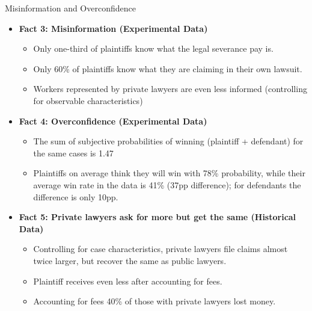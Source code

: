 \documentclass[9pt]{beamer}
\begin{document}
\begin{frame}{Misinformation and Overconfidence}
\begin{itemize}
 \item \textbf{Fact 3: Misinformation (Experimental Data)}
        \vspace{0.05in}
        \begin{itemize}
            \item Only one-third of plaintiffs know what the legal severance pay is.
            \vspace{0.05in}
            \item Only 60\% of plaintiffs know what they are claiming in their own lawsuit. 
            \vspace{0.05in}
            \item Workers represented by private lawyers are even less informed (controlling for observable characteristics)
        \end{itemize}
    
    \pause
   \vspace{5mm}
  \item  \textbf{Fact 4: Overconfidence (Experimental Data)} 
  
  \begin{itemize}
      \item The sum of subjective probabilities of winning (plaintiff + defendant) for the same cases is 1.47
      \item Plaintiffs on average think they will win with 78\% probability, while their average win rate in the data is 41\% (37pp difference); for defendants the difference is only 10pp.
      
  \end{itemize}
  
  \pause
  \vspace{5mm}
  \item \textbf{Fact 5: Private lawyers ask for more but get the same (Historical Data)} 
         \vspace{2mm}
      \begin{itemize}
          \item Controlling for case characteristics, private lawyers file claims almost twice larger, but recover the same as public lawyers. 
          \item Plaintiff receives even less after accounting for fees.
          \item Accounting for fees 40\% of those with private lawyers lost money.
      \end{itemize}  
  
\end{itemize}
\end{frame}
 
\end{document}
